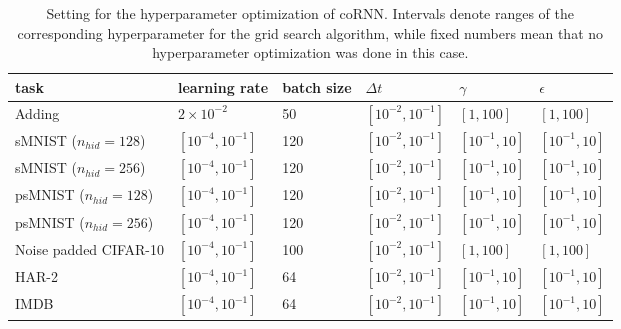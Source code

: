 \documentclass{article} \usepackage{iclr2021_conference,times}
\begin{document}
\begin{table}[h!]
  \caption{Setting for the hyperparameter optimization of coRNN. Intervals denote ranges of the corresponding hyperparameter for the grid search algorithm, while fixed numbers mean that no hyperparameter optimization was done in this case.}
  \label{tab:hyperparameters}
  \centering
  \begin{tabular}{llllll}
    \toprule
    \cmidrule(r){1-6}
    task & learning rate & batch size  & $\Delta t$ & 
    $\gamma$ & $\epsilon$ \\
    \midrule
Adding & $2\times 10^{-2}$ &50& $[10^{-2},10^{-1}]$ & $[1,100]$ & $[1,100]$\\
sMNIST ($n_{hid}=128$) & $[10^{-4},10^{-1}]$ & 120 & $[10^{-2},10^{-1}]$ & $[10^{-1},10]$ & $[10^{-1},10]$ \\
sMNIST ($n_{hid}=256$) & $[10^{-4},10^{-1}]$ & 120 &  $[10^{-2},10^{-1}]$  &$[10^{-1},10]$ & $[10^{-1},10]$\\
psMNIST ($n_{hid}=128$) & $[10^{-4},10^{-1}]$ & 120 & $[10^{-2},10^{-1}]$ & $[10^{-1},10]$ & $[10^{-1},10]$ \\
psMNIST ($n_{hid}=256$) & $[10^{-4},10^{-1}]$ & 120 &  $[10^{-2},10^{-1}]$ & $[10^{-1},10]$ & $[10^{-1},10]$ \\
Noise padded CIFAR-10 & $[10^{-4},10^{-1}]$ & 100 & $[10^{-2},10^{-1}]$ & $[1,100]$ & $[1,100]$ \\
HAR-2 & $[10^{-4},10^{-1}]$ & 64 & $[10^{-2},10^{-1}]$ & $[10^{-1},10]$ & $[10^{-1},10]$ \\
IMDB &$[10^{-4},10^{-1}]$ & 64  & $[10^{-2},10^{-1}]$ & $[10^{-1},10]$ & $[10^{-1},10]$ \\
    \bottomrule
  \end{tabular}
\end{table}
\end{document}
